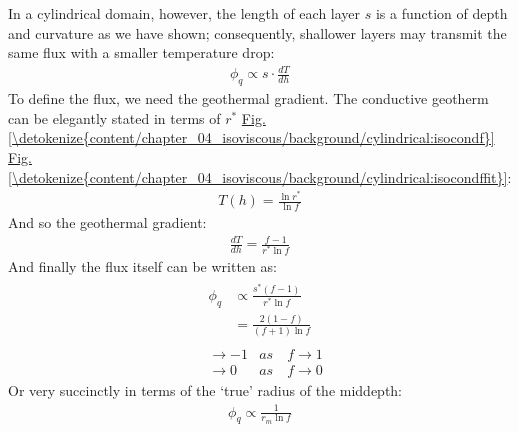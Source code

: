 \documentclass[letterpaper,10pt,english]{jupyterBook}
\begin{document}
\sphinxAtStartPar
In a cylindrical domain, however, the length of each layer \(s\) is a function of depth and curvature as we have shown; consequently, shallower layers may transmit the same flux with a smaller temperature drop:
\begin{equation*}
\begin{split}
\phi_q \propto s \cdot \frac{dT}{dh}
\end{split}
\end{equation*}
\sphinxAtStartPar
To define the flux, we need the geothermal gradient. The conductive geotherm can be elegantly stated in terms of \(r^{*}\) \hyperref[\detokenize{content/chapter_04_isoviscous/background/cylindrical:isocondf}]{Fig.\@ \ref{\detokenize{content/chapter_04_isoviscous/background/cylindrical:isocondf}}} \hyperref[\detokenize{content/chapter_04_isoviscous/background/cylindrical:isocondffit}]{Fig.\@ \ref{\detokenize{content/chapter_04_isoviscous/background/cylindrical:isocondffit}}}:
\begin{equation*}
\begin{split}
T(h) = \frac{\ln{r^{*}}}{\ln{f}}
\end{split}
\end{equation*}
\sphinxAtStartPar
And so the geothermal gradient:
\begin{equation*}
\begin{split}
\frac{dT}{dh} = \frac{f-1}{r^{*}\ln{f}}
\end{split}
\end{equation*}
\sphinxAtStartPar
And finally the flux itself can be written as:
\begin{equation*}
\begin{split} \begin{align*}
\phi_q &\propto \frac{s^{*}(f-1)}{r^{*}\ln{f}} \\
&= \frac{2(1-f)}{(f+1)\ln{f}}
\end{align*} \end{split}
\end{equation*}\begin{equation*}
\begin{split} \begin{align*}
&\to -1 &as \quad f \to 1 \\
&\to 0 &as \quad f \to 0
\end{align*} \end{split}
\end{equation*}
\sphinxAtStartPar
Or very succinctly in terms of the ‘true’ radius of the mid\sphinxhyphen{}depth:
\begin{equation*}
\begin{split}
\phi_q \propto \frac{1}{r_m \ln{f}}
\end{split}
\end{equation*}
\end{document}
